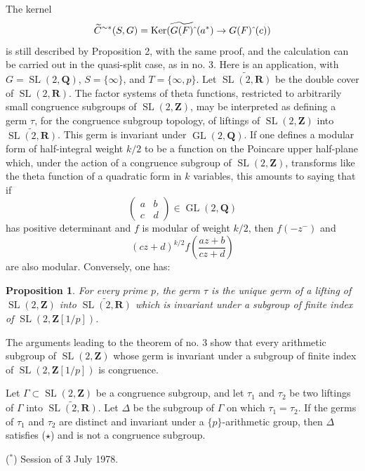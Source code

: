 \documentclass[10pt]{amsart}
\theoremstyle{plain}
\newtheorem{proposition}{Proposition}
\theoremstyle{definition}
\DeclareMathOperator{\Ker}{Ker}
\DeclareMathOperator{\SL}{SL}
\DeclareMathOperator{\GL}{GL}
\begin{document}
The kernel
\[
\widetilde C^{\sim *}(S,G)=\Ker(\widetilde{G(F)}\hat{\mkern6mu}(a^*)\to G(F)\hat{\mkern6mu}(c))
\]
is still described by Proposition 2, with the same proof, and the calculation can be carried out in the quasi-split case, as in no. 3. Here is an application, with $G=\SL(2,\mathbf Q)$, $S=\{\infty\}$, and $T=\{\infty,p\}$. Let $\widetilde{\SL(2,\mathbf R)}$ be the double cover of $\SL(2,\mathbf R)$. The factor systems of theta functions, restricted to arbitrarily small congruence subgroups of $\SL(2,\mathbf Z)$, may be interpreted as defining a germ $\tau$, for the congruence subgroup topology, of liftings of $\SL(2,\mathbf Z)$ into $\widetilde{\SL(2,\mathbf R)}$. This germ is invariant under $\GL(2,\mathbf Q)$. If one defines a modular form of half-integral weight $k/2$ to be a function on the Poincare upper half-plane which, under the action of a congruence subgroup of $\SL(2,\mathbf Z)$, transforms like the theta function of a quadratic form in $k$ variables, this amounts to saying that if
\[
\begin{pmatrix}a&b\\ c&d\end{pmatrix}\in\GL(2,\mathbf Q)
\]
has positive determinant and $f$ is modular of weight $k/2$, then $f(-z^{-})$ and
\[
(cz+d)^{k/2}f\left(\frac{az+b}{cz+d}\right)
\]
are also modular. Conversely, one has:

\begin{proposition}
For every prime $p$, the germ $\tau$ is the unique germ of a lifting of $\SL(2,\mathbf Z)$ into $\widetilde{\SL(2,\mathbf R)}$ which is invariant under a subgroup of finite index of $\SL(2,\mathbf Z[1/p])$.
\end{proposition}

The arguments leading to the theorem of no. 3 show that every arithmetic subgroup of $\SL(2,\mathbf Z)$ whose germ is invariant under a subgroup of finite index of $\SL(2,\mathbf Z[1/p])$ is congruence.

Let $\Gamma\subset\SL(2,\mathbf Z)$ be a congruence subgroup, and let $\tau_1$ and $\tau_2$ be two liftings of $\Gamma$ into $\widetilde{\SL(2,\mathbf R)}$. Let $\Delta$ be the subgroup of $\Gamma$ on which $\tau_1=\tau_2$. If the germs of $\tau_1$ and $\tau_2$ are distinct and invariant under a $\{p\}$-arithmetic group, then $\Delta$ satisfies ($\star$) and is not a congruence subgroup.

\vspace{1cm}

\noindent($^*$) Session of 3 July 1978.
\end{document}
